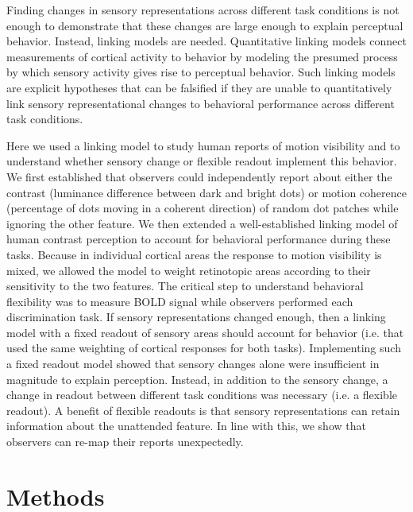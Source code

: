 Finding changes in sensory representations across different task conditions is not enough to demonstrate that these changes are large enough to explain perceptual behavior.  Instead, linking models are needed. Quantitative linking models \citep{Barlow1972-kz,Brindley1970-ea,Cohen2010-xs,Cook2002-zs,Newsome1989-fr,Pestilli2011-gi,Teller1984-yx,Hara2014-mv} connect measurements of cortical activity to behavior by modeling the presumed process by which sensory activity gives rise to perceptual behavior. Such linking models are explicit hypotheses that can be falsified if they are unable to quantitatively link sensory representational changes to behavioral performance across different task conditions.

Here we used a linking model to study human reports of motion visibility and to understand whether sensory change or flexible readout implement this behavior. We first established that observers could independently report about either the contrast (luminance difference between dark and bright dots) or motion coherence (percentage of dots moving in a coherent direction) of random dot patches while ignoring the other feature. We then extended a well-established linking model of human contrast perception \citep{Boynton1999-jd,Foley1981-aw,Gardner2015-bd,Ling2006-zx,Nachmias1974-vz,Pestilli2009-xu,Pestilli2011-gi} to account for behavioral performance during these tasks. Because in individual cortical areas the response to motion visibility is mixed, we allowed the model to weight retinotopic areas according to their sensitivity to the two features. The critical step to understand behavioral flexibility was to measure BOLD signal while observers performed each discrimination task. If sensory representations changed enough, then a linking model with a fixed readout of sensory areas should account for behavior (i.e. that used the same weighting of cortical responses for both tasks). Implementing such a fixed readout model showed that sensory changes alone were insufficient in magnitude to explain perception. Instead, in addition to the sensory change, a change in readout between different task conditions was necessary (i.e. a flexible readout). A benefit of flexible readouts is that sensory representations can retain information about the unattended feature. In line with this, we show that observers can re-map their reports unexpectedly. 

\section{Methods}

